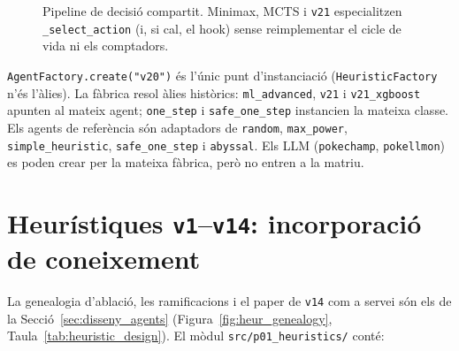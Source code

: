 \begin{figure}[htbp]
    \centering
    \caption{Pipeline de decisió compartit. Minimax, MCTS i \texttt{v21} especialitzen \texttt{\_select\_action} (i, si cal, el hook) sense reimplementar el cicle de vida ni els comptadors.}
    \label{fig:template_method}
\end{figure}

\texttt{AgentFactory.create("v20")} és l'únic punt d'instanciació (\texttt{HeuristicFactory} n'és l'àlies). La fàbrica resol àlies històrics: \texttt{ml\_advanced}, \texttt{v21} i \texttt{v21\_xgboost} apunten al mateix agent; \texttt{one\_step} i \texttt{safe\_one\_step} instancien la mateixa classe. Els agents de referència són adaptadors de \texttt{random}, \texttt{max\_power}, \texttt{simple\_heuristic}, \texttt{safe\_one\_step} i \texttt{abyssal}. Els LLM (\texttt{pokechamp}, \texttt{pokellmon}) es poden crear per la mateixa fàbrica, però no entren a la matriu.

\section{Heurístiques \texttt{v1}--\texttt{v14}: incorporació de coneixement}
\label{sec:heur_impl}

La genealogia d'ablació, les ramificacions i el paper de \texttt{v14} com a servei són els de la Secció~\ref{sec:disseny_agents} (Figura~\ref{fig:heur_genealogy}, Taula~\ref{tab:heuristic_design}). El mòdul \texttt{src/p01\_heuristics/} conté:

